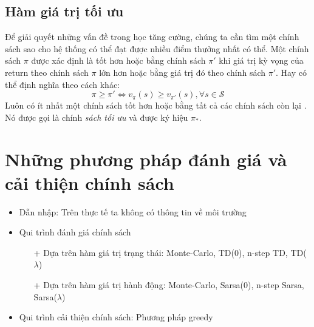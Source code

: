 	\subsection{Hàm giá trị tối ưu}
	Để giải quyết những vấn đề trong học tăng cường, chúng ta cần tìm một chính sách sao cho hệ thống có thể đạt được nhiều điểm thưởng nhất có thể. Một chính sách $\pi$ được xác định là tốt hơn hoặc bằng chính sách $\pi'$ khi giá trị kỳ vọng của return theo chính sách $\pi$ lớn hơn hoặc bằng giá trị đó theo chính sách $\pi'$. Hay có thể định nghĩa theo cách khác:
	\begin{equation}
		\pi \geq \pi' \Longleftrightarrow v_{\pi}(s) \geq v_{\pi'}(s), \forall s \in \mathcal{S}
	\end{equation}
	Luôn có ít nhất một chính sách tốt hơn hoặc bằng tất cả các chính sách còn lại \cite{sutton1998introduction}. Nó được gọi là chính \textit{sách tối ưu} và được ký hiệu $\pi_{*}$.
	
\section{Những phương pháp đánh giá và cải thiện chính sách}
	\begin{itemize}
		\item Dẫn nhập: Trên thực tế ta không có thông tin về môi trường
		\item Qui trình đánh giá chính sách
			\begin{itemize}
				\item[+] Dựa trên hàm giá trị trạng thái: Monte-Carlo, TD(0), n-step TD, TD($\lambda$)
				\item[+] Dựa trên hàm giá trị hành động: Monte-Carlo, Sarsa(0), n-step Sarsa, Sarsa($\lambda$)
			\end{itemize}
		\item Qui trình cải thiện chính sách: Phương pháp greedy
	\end{itemize}
	
